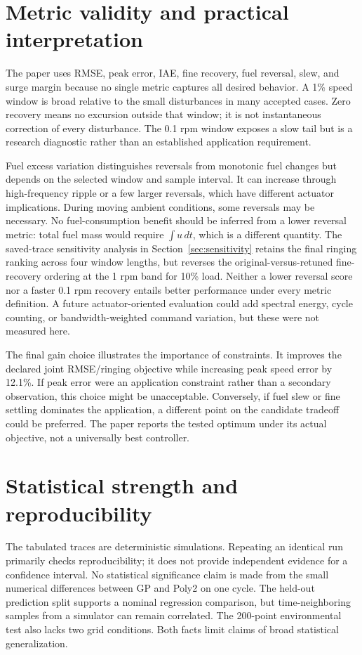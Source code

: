 \documentclass[11pt,a4paper,oneside]{report}
\begin{document}
\section{Metric validity and practical interpretation}
The paper uses RMSE, peak error, IAE, fine recovery, fuel reversal, slew, and surge margin because no single metric captures all desired behavior. A 1\% speed window is broad relative to the small disturbances in many accepted cases. Zero recovery means no excursion outside that window; it is not instantaneous correction of every disturbance. The 0.1 rpm window exposes a slow tail but is a research diagnostic rather than an established application requirement.

Fuel excess variation distinguishes reversals from monotonic fuel changes but depends on the selected window and sample interval. It can increase through high-frequency ripple or a few larger reversals, which have different actuator implications. During moving ambient conditions, some reversals may be necessary. No fuel-consumption benefit should be inferred from a lower reversal metric: total fuel mass would require $\int u\,dt$, which is a different quantity. The saved-trace sensitivity analysis in Section~\ref{sec:sensitivity} retains the final ringing ranking across four window lengths, but reverses the original-versus-retuned fine-recovery ordering at the 1 rpm band for 10\% load. Neither a lower reversal score nor a faster 0.1 rpm recovery entails better performance under every metric definition. A future actuator-oriented evaluation could add spectral energy, cycle counting, or bandwidth-weighted command variation, but these were not measured here.

The final gain choice illustrates the importance of constraints. It improves the declared joint RMSE/ringing objective while increasing peak speed error by 12.1\%. If peak error were an application constraint rather than a secondary observation, this choice might be unacceptable. Conversely, if fuel slew or fine settling dominates the application, a different point on the candidate tradeoff could be preferred. The paper reports the tested optimum under its actual objective, not a universally best controller.

\section{Statistical strength and reproducibility}
The tabulated traces are deterministic simulations. Repeating an identical run primarily checks reproducibility; it does not provide independent evidence for a confidence interval. No statistical significance claim is made from the small numerical differences between GP and Poly2 on one cycle. The held-out prediction split supports a nominal regression comparison, but time-neighboring samples from a simulator can remain correlated. The 200-point environmental test also lacks two grid conditions. Both facts limit claims of broad statistical generalization.
\end{document}
